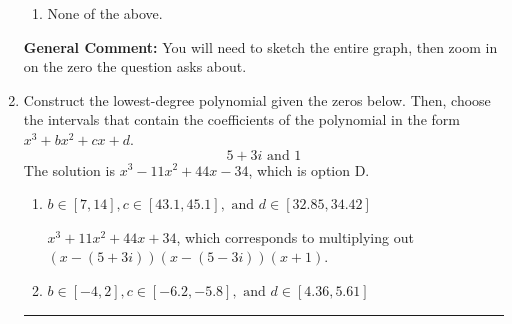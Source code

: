 \documentclass{extbook}[14pt]
\newcommand{\litem}[1]{\item #1

\rule{\textwidth}{0.4pt}}
\begin{document}
\begin{enumerate}
{\begin{enumerate}[label=\Alph*.]
\item None of the above.\end{enumerate}
\textbf{General Comment:} You will need to sketch the entire graph, then zoom in on the zero the question asks about.
}
\litem{
Construct the lowest-degree polynomial given the zeros below. Then, choose the intervals that contain the coefficients of the polynomial in the form $x^3+bx^2+cx+d$.
\[ 5 + 3 i \text{ and } 1 \]The solution is \( x^{3} -11 x^{2} +44 x -34 \), which is option D.\begin{enumerate}[label=\Alph*.]
\item \( b \in [7, 14], c \in [43.1, 45.1], \text{ and } d \in [32.85, 34.42] \)

$x^{3} +11 x^{2} +44 x + 34$, which corresponds to multiplying out $(x-(5 + 3 i))(x-(5 - 3 i))(x + 1)$.
\item \( b \in [-4, 2], c \in [-6.2, -5.8], \text{ and } d \in [4.36, 5.61] \)


\end{enumerate}}
\end{enumerate}
\end{document}
